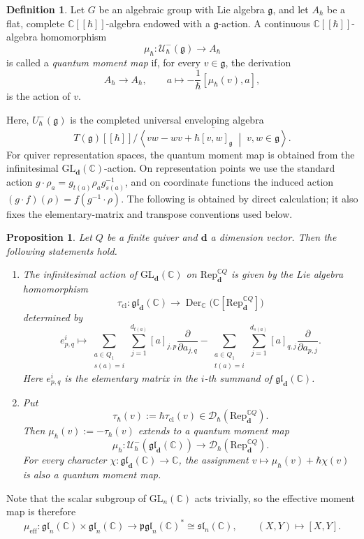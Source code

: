 \documentclass[11pt,reqno]{amsart}
\newtheorem{proposition}[theorem]{Proposition}
\theoremstyle{definition}
\newtheorem{definition}[theorem]{Definition}
\newcommand{\bbC}{\mathbb{C}}
\newcommand{\gl}{\mathfrak{gl}}
\newcommand{\GL}{\mathrm{GL}}
\newcommand{\tos}{\mapsto}
\newcommand{\Rep}{\mathrm{Rep}}
\newcommand{\bd}{\mathbf{d}}
\newcommand{\mD}{\mathcal{D}}
\begin{document}
\begin{definition}\label{def: quantum moment map}
Let \(G\) be an algebraic group with Lie algebra \(\mathfrak g\), and let \(A_\hbar\) be a flat, complete \(\mathbb C[[\hbar]]\)-algebra endowed with a \(\mathfrak g\)-action.
A continuous \(\mathbb C[[\hbar]]\)-algebra homomorphism
\[
\mu_\hbar\colon\mathcal U_\hbar^-(\mathfrak g)\longrightarrow A_\hbar
\]
is called a \emph{quantum moment map} if, for every \(v\in\mathfrak g\), the derivation
\[
A_\hbar\longrightarrow A_\hbar,
\qquad
a\tos-\frac{1}{\hbar}[\mu_\hbar(v),a],
\]
is the action of \(v\).
\end{definition}
Here, \(U_{\hbar}^{-}(\mathfrak g)\) is the completed universal enveloping algebra
\[T(\mathfrak g)[[\hbar]]\Big/\overline{
\left\langle
vw-wv+\hbar[v,w]_{\mathfrak g}
\;\middle|\;
v,w\in\mathfrak g
\right\rangle}.
\]
For quiver representation spaces, the quantum moment map is obtained from the infinitesimal \(\GL_\bd(\bbC)\)-action.
On representation points we use the standard action
\(g\cdot\rho_a=g_{t(a)}\rho_a g_{s(a)}^{-1}\), and on coordinate
functions the induced action \((g\cdot f)(\rho)=f(g^{-1}\cdot\rho)\).
The following is obtained by direct calculation; it also fixes the
elementary-matrix and transpose conventions used below.

\begin{proposition}\label{prop: chi + habr br}
Let \(Q\) be a finite quiver and \(\bd\) a dimension vector. Then the following statements hold.
\begin{enumerate}
\item The infinitesimal action of \(\GL_\bd(\bbC)\) on \({\Rep^{\bbC Q}_\bd}\) is given by the Lie algebra homomorphism
\[
\tau_{\mathrm{cl}}\colon\gl_\bd(\bbC)
\longrightarrow
\operatorname{Der}_{\bbC} \big(\bbC[\Rep^{\bbC Q}_\bd]\big)
\]
determined by
\begin{equation}\label{for: tau}
e^i_{p,q}\tos
\sum_{\substack{a\in Q_1\\s(a)=i}}\sum_{j=1}^{d_{t(a)}}[a]_{j,p}
\frac{\partial}{\partial a_{j,q}}
-
\sum_{\substack{a\in Q_1\\t(a)=i}}\sum_{j=1}^{d_{s(a)}}[a]_{q,j}
\frac{\partial}{\partial a_{p,j}}.
\end{equation}
Here \({e^i_{p,q}}\) is the elementary matrix in the \(i\)-th summand of \(\gl_\bd(\bbC)\).

\item Put
\[
\tau_\hbar(v):=\hbar\tau_{\mathrm{cl}}(v)
\in\mD_\hbar(\Rep^{\bbC Q}_\bd).
\]
Then \(\mu_\hbar(v):=-\tau_\hbar(v)\) extends to a quantum
moment map
\[
\mu_\hbar:\mathcal U_\hbar^-(\gl_\bd(\bbC))
\longrightarrow\mD_\hbar(\Rep^{\bbC Q}_\bd).
\]
For every character \(\chi:\gl_\bd(\bbC)\to\bbC\), the assignment
\(v\mapsto\mu_\hbar(v)+\hbar\chi(v)\) is also a quantum moment map.
\end{enumerate}
\end{proposition}
Note that the scalar subgroup of \(\GL_n(\bbC)\) acts
trivially, so the effective moment map is therefore
\[
\mu_{\mathrm{eff}}:
\gl_n(\bbC)\times\gl_n(\bbC)
\longrightarrow\mathfrak{pgl}_n(\bbC)^*
\cong\mathfrak{sl}_n(\bbC),
\qquad (X,Y)\longmapsto[X,Y].
\]
\end{document}
